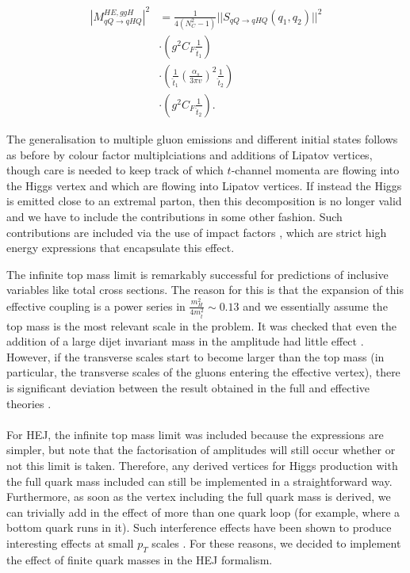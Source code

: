 \begin{equation}
\begin{split}
|M_{qQ \to qHQ}^{HE,ggH}|^2 &= \frac{1}{4(N_C^2 - 1)} ||S_{qQ \to qHQ}(q_1, q_2)||^2 \\
& \cdot \left(g^2 C_F \frac{1}{\hat{t}_1} \right) \\
& \cdot \left(\frac{1}{\hat{t}_1} \left(\frac{\alpha_s}{3 \pi v} \right)^2 \frac{1}{\hat{t}_2} \right) \\
& \cdot \left(g^2 C_F \frac{1}{\hat{t}_2} \right).
\end{split}
\end{equation}

The generalisation to multiple gluon emissions and different initial states follows as before by colour factor multiplciations and additions of Lipatov vertices, though care is needed to keep track of which $t$-channel momenta are flowing into the Higgs vertex and which are flowing into Lipatov vertices. If instead the Higgs is emitted close to an extremal parton, then this decomposition is no longer valid and we have to include the contributions in some other fashion. Such contributions are included via the use of impact factors \cite{Duca2003}, which are strict high energy expressions that encapsulate this effect.  

The infinite top mass limit is remarkably successful for predictions of inclusive variables like total cross sections. The reason for this is that the expansion of this effective coupling is a power series in $\frac{m_H^2}{4 m_t^2} \sim 0.13$ and we essentially assume the top mass is the most relevant scale in the problem. It was checked that even the addition of a large dijet invariant mass in the amplitude had little effect \cite{Duca2003}. However, if the transverse scales start to become larger than the top mass (in particular, the transverse scales of the gluons entering the effective vertex), there is significant deviation between the result obtained in the full and effective theories \cite{Duca2003}. \\
\\
For HEJ, the infinite top mass limit was included because the expressions are simpler, but note that the factorisation of amplitudes will still occur whether or not this limit is taken. Therefore, any derived vertices for Higgs production with the full quark mass included can still be implemented in a straightforward way. Furthermore, as soon as the vertex including the full quark mass is derived, we can trivially add in the effect of more than one quark loop (for example, where a bottom quark runs in it). Such interference effects have been shown to produce interesting effects at small $p_T$ scales \cite{Grazzini2013}. For these reasons, we decided to implement the effect of finite quark masses in the HEJ formalism. 

